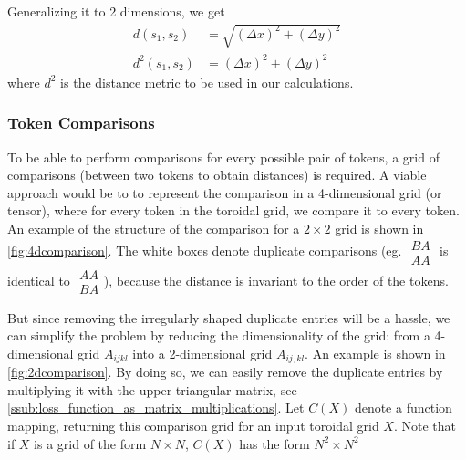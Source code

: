 Generalizing it to 2 dimensions, we get
\begin{align*}
    d(s_1,s_2)&=\sqrt{(\Delta x)^2+(\Delta y)^2} \\
    d^2(s_1,s_2)&=(\Delta x)^2+(\Delta y)^2
\end{align*}
where $d^2$ is the distance metric to be used in our calculations.

\subsubsection{Token Comparisons}%
\label{ssub:token_comparisons}
To be able to perform comparisons for every possible pair of tokens, a grid of comparisons (between two tokens to obtain distances) is required. A viable approach would be to to represent the comparison in a 4-dimensional grid (or tensor), where for every token in the toroidal grid, we compare it to every token. An example of the structure of the comparison for a $2\times 2$ grid is shown in \autoref{fig:4dcomparison}. The white boxes denote duplicate comparisons (eg. $
\begin{smallmatrix}
    BA\\ AA
\end{smallmatrix}
$ is identical to
$
\begin{smallmatrix}
    AA\\ BA
\end{smallmatrix}
$), because the distance is invariant to the order of the tokens.


But since removing the irregularly shaped duplicate entries will be a hassle, we can simplify the problem by reducing the dimensionality of the grid: from a 4-dimensional grid $A_{ijkl}$ into a 2-dimensional grid $A_{ij,kl}$. An example is shown in \autoref{fig:2dcomparison}. By doing so, we can easily remove the duplicate entries by multiplying it with the upper triangular matrix, see \autoref{ssub:loss_function_as_matrix_multiplications}. Let $C(X)$ denote a function mapping, returning this comparison grid for an input toroidal grid $X$. Note that if $X$ is a grid of the form $N\times N$, $C(X)$ has the form $N^2\times N^2$

\begin{figure}[htpb]
    \centering
    \label{fig:twodcomparisonGrid}
\end{figure}

